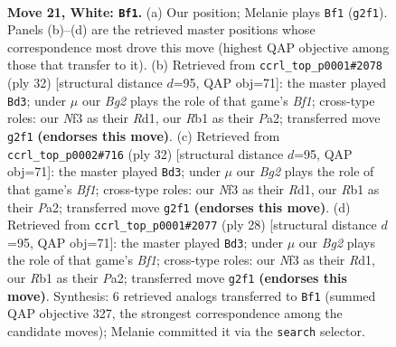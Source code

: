 \documentclass[11pt]{article}
\begin{document}
\clearpage

\begin{figure}[p]\centering
\begin{subfigure}{0.46\textwidth}\centering
\resizebox{\linewidth}{!}{%
\newchessgame
\chessboard[
  setfen={r1bnrk2/1ppp1ppp/p2q4/B2P4/4n3/4PNP1/PP2RPBP/1R1Q2K1 w - - 17 21},
  showmover=false,
  pgfstyle=straightmove, color=movearrow, markmove={g2-f1}
]}
\caption{}
\end{subfigure}\hfill
\begin{subfigure}{0.46\textwidth}\centering
\resizebox{\linewidth}{!}{%
\newchessgame
\chessboard[
  setfen={r1b2rk1/3p1ppp/p1p1pn2/4q3/4P3/2N2P2/PPP3PP/2KRQB1R w - - 1 17},
  showmover=false,
  pgfstyle=straightmove, color=movearrow, markmove={f1-d3}
]}
\caption{}
\end{subfigure}
\\[4pt]
\begin{subfigure}{0.46\textwidth}\centering
\resizebox{\linewidth}{!}{%
\newchessgame
\chessboard[
  setfen={r1b2rk1/3p1ppp/p1p1pn2/4q3/4P3/2N2P2/PPP3PP/2KRQB1R w - - 1 17},
  showmover=false,
  pgfstyle=straightmove, color=movearrow, markmove={f1-d3}
]}
\caption{}
\end{subfigure}\hfill
\begin{subfigure}{0.46\textwidth}\centering
\resizebox{\linewidth}{!}{%
\newchessgame
\chessboard[
  setfen={r1b2rk1/3p1ppp/p1p1pn2/4q3/4P3/2N2P2/PPP3PP/2KRQB1R w - - 1 15},
  showmover=false,
  pgfstyle=straightmove, color=movearrow, markmove={f1-d3}
]}
\caption{}
\end{subfigure}
\caption{\textbf{Move 21, White: \texttt{Bf1}.} (a) Our position; Melanie plays \texttt{Bf1} (\texttt{g2f1}). Panels (b)--(d) are the retrieved master positions whose correspondence most drove this move (highest QAP objective among those that transfer to it). (b) Retrieved from \texttt{ccrl\_top\_p0001\#2078} (ply 32) [structural distance $d$=95, QAP obj=71]: the master played \texttt{Bd3}; under $\mu$ our \emph{Bg2} plays the role of that game's \emph{Bf1}; cross-type roles: our \emph{N}f3 as their \emph{R}d1, our \emph{R}b1 as their \emph{P}a2; transferred move \texttt{g2f1} \textbf{(endorses this move)}. (c) Retrieved from \texttt{ccrl\_top\_p0002\#716} (ply 32) [structural distance $d$=95, QAP obj=71]: the master played \texttt{Bd3}; under $\mu$ our \emph{Bg2} plays the role of that game's \emph{Bf1}; cross-type roles: our \emph{N}f3 as their \emph{R}d1, our \emph{R}b1 as their \emph{P}a2; transferred move \texttt{g2f1} \textbf{(endorses this move)}. (d) Retrieved from \texttt{ccrl\_top\_p0001\#2077} (ply 28) [structural distance $d$=95, QAP obj=71]: the master played \texttt{Bd3}; under $\mu$ our \emph{Bg2} plays the role of that game's \emph{Bf1}; cross-type roles: our \emph{N}f3 as their \emph{R}d1, our \emph{R}b1 as their \emph{P}a2; transferred move \texttt{g2f1} \textbf{(endorses this move)}. Synthesis: 6 retrieved analogs transferred to \texttt{Bf1} (summed QAP objective 327, the strongest correspondence among the candidate moves); Melanie committed it via the \texttt{search} selector.}
\label{fig:thought-m40}
\end{figure}
\end{document}
